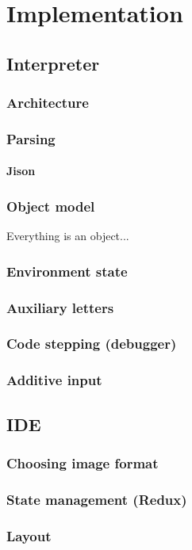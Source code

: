 \chapter{Implementation}

\section{Interpreter}

\subsection{Architecture}

\subsection{Parsing}

\subsubsection*{Jison}

\subsection{Object model}
Everything is an object...

\subsection{Environment state}

\subsection{Auxiliary letters}

\subsection{Code stepping (debugger)}

\subsection{Additive input}

\section{IDE}

\subsection{Choosing image format}

\subsection{State management (Redux)}

\subsection{Layout}